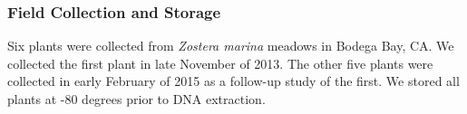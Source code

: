 
\subsubsection{\textbf{Field Collection and Storage}}

    Six plants were collected from \textit{Zostera marina} meadows in Bodega Bay, CA. We collected the first plant in late November of 2013. The other five plants were collected in early February of 2015 as a follow-up study of the first. We stored all plants at -80 degrees prior to DNA extraction. 
    
    
    
